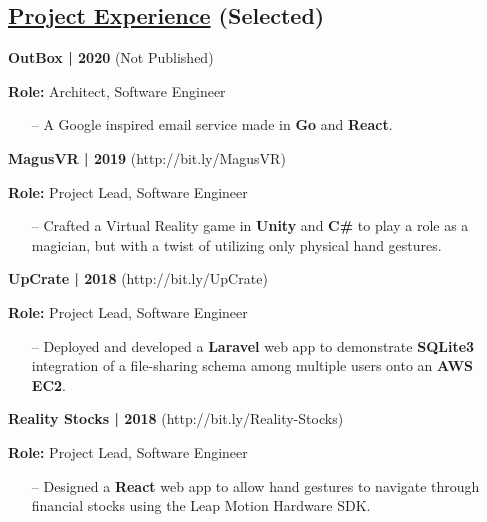 \documentclass{article}
\begin{document}
\begin{multicols}{2}
\section*{\underline{Project Experience} {\small(Selected)}}
{\footnotesize{\textbf{OutBox | 2020} (Not Published)}}
{\footnotesize{
\newline\textbf{Role:} Architect, Software Engineer
\begin{itemize}
	\item[--] A Google inspired email service made in \textbf{Go} and \textbf{React}.
\end{itemize}
\hfill \break
}}
{\footnotesize{\textbf{MagusVR | 2019} (http://bit.ly/MagusVR)}}
{\footnotesize{
\newline\textbf{Role:} Project Lead, Software Engineer
\begin{itemize}
	\item[--] Crafted a Virtual Reality game in \textbf{Unity} and \textbf{C\#} to play a role as a magician, but with a twist of utilizing only physical hand gestures.
\end{itemize}
\hfill \break
}}
{\footnotesize{\textbf{UpCrate | 2018} (http://bit.ly/UpCrate)}}
{\footnotesize{
\newline\textbf{Role:} Project Lead, Software Engineer
\begin{itemize}
	\item[--] Deployed and developed a \textbf{Laravel} web app to demonstrate \textbf{SQLite3} integration of a file-sharing schema among multiple users onto an \textbf{AWS EC2}.
\end{itemize}
\hfill \break
}}
{\footnotesize{\textbf{Reality Stocks | 2018} (http://bit.ly/Reality-Stocks)}}
{\footnotesize{
\newline\textbf{Role:} Project Lead, Software Engineer
\begin{itemize}
	\item[--] Designed a \textbf{React} web app to allow hand gestures to navigate through financial stocks using the Leap Motion Hardware SDK.
\end{itemize}
}}
\hfill \break

\end{multicols}
\end{document}
